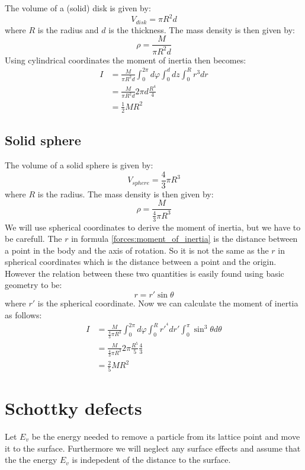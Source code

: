 	The volume of a (solid) disk is given by:
	\begin{equation}
		V_{disk} = \pi R^2d
	\end{equation}
	where $R$ is the radius and $d$ is the thickness. The mass density is then given by:
	\begin{equation}
		\rho = \frac{M}{\pi R^2d}
	\end{equation}
	Using cylindrical coordinates the moment of inertia then becomes:
	\begin{align}
		I &= \frac{M}{\pi R^2d}\int_0^{2\pi}d\varphi\int_0^ddz\int_0^Rr^3dr\\
		&= \frac{M}{\pi R^2d}2\pi d\frac{R^4}{4}\\
		&= \frac{1}{2}MR^2
	\end{align}
	
\subsection{Solid sphere}

	The volume of a solid sphere is given by:
	\begin{equation}
		V_{sphere} = \frac{4}{3}\pi R^3
	\end{equation}
	where $R$ is the radius. The mass density is then given by:
	\begin{equation}
		\rho = \frac{M}{\frac{4}{3}\pi R^3}
	\end{equation}
	We will use spherical coordinates to derive the moment of inertia, but we have to be carefull. The $r$ in formula \ref{forces:moment_of_inertia} is the distance between a point in the body and the axis of rotation. So it is not the same as the $r$ in spherical coordinates which is the distance between a point and the origin. However the relation between these two quantities is easily found using basic geometry to be:
	\begin{equation}
		r = r'\sin\theta
	\end{equation}
	where $r'$ is the spherical coordinate. Now we can calculate the moment of inertia as follows:
	\begin{align}
		I &= \frac{M}{\frac{4}{3}\pi R^3} \int_0^{2\pi}d\varphi\int_0^Rr'^{^4}dr'\int_0^\pi\sin^3\theta d\theta\\
		&= \frac{M}{\frac{4}{3}\pi R^3} 2\pi \frac{R^5}{5} \frac{4}{3}\\
		&= \frac{2}{5}MR^2
	\end{align}

\section{Schottky defects}\label{deriv:schottky_defects}
	Let $E_v$ be the energy needed to remove a particle from its lattice point and move it to the surface. Furthermore we will neglect any surface effects and assume that the the energy $E_v$ is indepedent of the distance to the surface.
    

